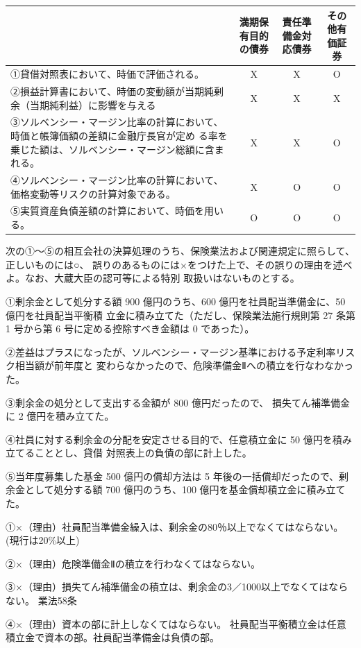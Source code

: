 \documentclass[report,gutter=10mm,fore-edge=10mm,uplatex,dvipdfmx]{jlreq}
\begin{document}
\answer{}

\begin{tabularx}{\textwidth}{|X|c|c|c|}
\hline
 & 満期保有目的の債券&責任準備金対応債券&その他有価証券 \\ \hline
①貸借対照表において、時価で評価される。 & X & X&O \\ \hline
②損益計算書において、時価の変動額が当期純剰余（当期純利益）に影響を与える& X&X &X \\ \hline
③ソルベンシー・マージン比率の計算において、時価と帳簿価額の差額に金融庁長官が定め
る率を乗じた額は、ソルベンシー・マージン総額に含まれる。&X &X &O \\ \hline
④ソルベンシー・マージン比率の計算において、価格変動等リスクの計算対象である。& X&O &O \\ \hline
⑤実質資産負債差額の計算において、時価を用いる。&O &O &O \\ \hline
\end{tabularx}

次の①～⑤の相互会社の決算処理のうち、保険業法および関連規定に照らして、正しいものには○、
誤りのあるものには×をつけた上で、その誤りの理由を述べよ。なお、大蔵大臣の認可等による特別
取扱いはないものとする。

①剰余金として処分する額 900 億円のうち、600 億円を社員配当準備金に、50 億円を社員配当平衡積
立金に積み立てた（ただし、保険業法施行規則第 27 条第 1 号から第 6 号に定める控除すべき金額は
0 であった）。

②差益はプラスになったが、ソルベンシー・マージン基準における予定利率リスク相当額が前年度と
変わらなかったので、危険準備金Ⅱへの積立を行なわなかった。

③剰余金の処分として支出する金額が 800 億円だったので、
損失てん補準備金に 2 億円を積み立てた。

④社員に対する剰余金の分配を安定させる目的で、任意積立金に 50 億円を積み立てることとし、貸借
対照表上の負債の部に計上した。

⑤当年度募集した基金 500 億円の償却方法は 5 年後の一括償却だったので、剰余金として処分する額
700 億円のうち、100 億円を基金償却積立金に積み立てた。

\answer{}

①×（理由）社員配当準備金繰入は、剰余金の80％以上でなくてはならない。
(現行は20\%以上)

②×（理由）危険準備金Ⅱの積立を行わなくてはならない。

③×（理由）損失てん補準備金の積立は、剰余金の3／1000以上でなくてはならない。
業法58条

④×（理由）資本の部に計上しなくてはならない。
社員配当平衡積立金は任意積立金で資本の部。社員配当準備金は負債の部。
\end{document}
